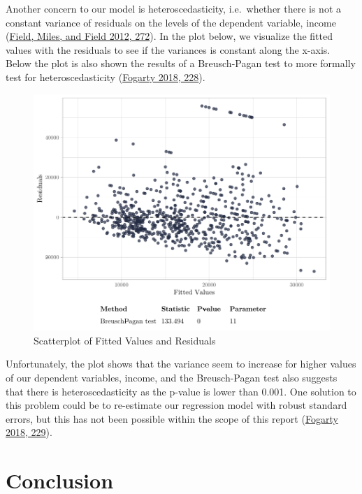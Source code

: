 \documentclass[
]{article}
\begin{document}
Another concern to our model is heteroscedasticity, i.e.~whether there
is not a constant variance of residuals on the levels of the dependent
variable, income (\protect\hyperlink{ref-field2012discovering}{Field,
Miles, and Field 2012, 272}). In the plot below, we visualize the fitted
values with the residuals to see if the variances is constant along the
x-axis. Below the plot is also shown the results of a Breusch-Pagan test
to more formally test for heteroscedasticity
(\protect\hyperlink{ref-fogarty2018quantitative}{Fogarty 2018, 228}).

\begin{figure}[H]

{\centering \includegraphics[width=0.8\linewidth]{paper_files/figure-latex/unnamed-chunk-5-1} 

}

\caption{Scatterplot of Fitted Values and Residuals}\label{fig:unnamed-chunk-5}
\end{figure}

Unfortunately, the plot shows that the variance seem to increase for
higher values of our dependent variables, income, and the Breusch-Pagan
test also suggests that there is heteroscedasticity as the p-value is
lower than 0.001. One solution to this problem could be to re-estimate
our regression model with robust standard errors, but this has not been
possible within the scope of this report
(\protect\hyperlink{ref-fogarty2018quantitative}{Fogarty 2018, 229}).

\pagebreak

\hypertarget{conclusion}{%
\section{Conclusion}\label{conclusion}}
\end{document}
